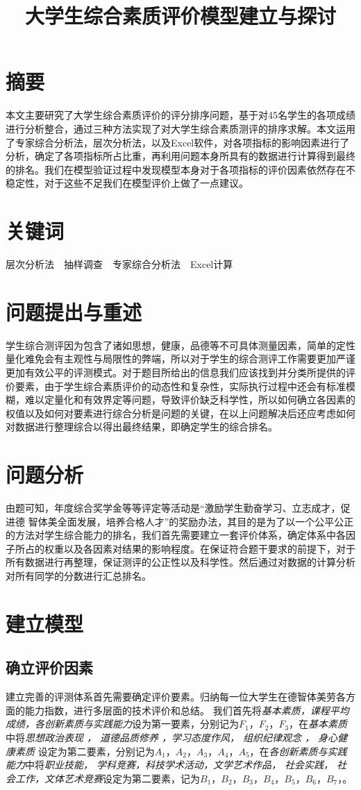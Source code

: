 \documentclass{ctexart}
\date{}
\title{大学生综合素质评价模型建立与探讨}
\begin{document}
\maketitle
\section*{摘要}
本文主要研究了大学生综合素质评价的评分排序问题，基于对45名学生的各项成绩进行分析整合，通过三种方法实现了对大学生综合素质测评的排序求解。本文运用了专家综合分析法，层次分析法，以及Excel软件，对各项指标的影响因素进行了分析，确定了各项指标所占比重，再利用问题本身所具有的数据进行计算得到最终的排名。我们在模型验证过程中发现模型本身对于各项指标的评价因素依然存在不稳定性，对于这些不足我们在模型评价上做了一点建议。
\section*{关键词}
层次分析法\ \ 抽样调查\ \ 专家综合分析法\ \ Excel计算

\newpage
\section{问题提出与重述}
学生综合测评因为包含了诸如思想，健康，品德等不可具体测量因素，简单的定性量化难免会有主观性与局限性的弊端，所以对于学生的综合测评工作需要更加严谨更加有效公平的评测模式。对于题目所给出的信息我们应该找到并分类所提供的评价要素，由于学生综合素质评价的动态性和复杂性，实际执行过程中还会有标准模糊，难以定量化和有效界定等问题，导致评价缺乏科学性，所以如何确立各因素的权值以及如何对要素进行综合分析是问题的关键，在以上问题解决后还应考虑如何对数据进行整理综合以得出最终结果，即确定学生的综合排名。

\section{问题分析}

由题可知，年度综合奖学金等等评定等活动是“激励学生勤奋学习、立志成才，促进德 智体美全面发展，培养合格人才”的奖励办法，其目的是为了以一个公平公正的方法对学生综合能力的排名，我们首先需要建立一套评价体系，确定体系中各因子所占的权重以及各因素对结果的影响程度。在保证符合题干要求的前提下，对于所有数据进行再整理，保证测评的公正性以及科学性。然后通过对数据的计算分析对所有同学的分数进行汇总排名。
\section{建立模型}
\subsection{确立评价因素}
建立完善的评测体系首先需要确定评价要素。归纳每一位大学生在德智体美劳各方面的能力指数，进行多层面的技术评价和总结。
我们首先将\emph{基本素质，课程平均成绩，各创新素质与实践能力}设为第一要素，分别记为$F_{1}$，$F_{2}$，$F_{3}$，在\emph{基本素质}中将\emph{思想政治表现 ， 道德品质修养 ，学习态度作风，  组织纪律观念 ， 身心健康素质 }设定为第二要素，分别记为$A_{1}$，$A_{2}$，$A_{3}$，$A_{4}$，$A_{5}$，在\emph{各创新素质与实践能力}中将\emph{职业技能， 学科竞赛，科技学术活动，文学艺术作品， 社会实践， 社会工作，文体艺术竞赛}设定为第二要素，记为$B_{1}$，$B_{2}$，$B_{3}$，$B_{4}$，$B_{5}$，$B_{6}$，$B_{7}$，。
\end{document}
